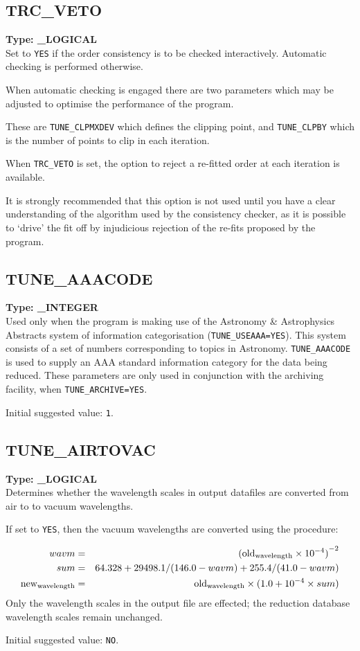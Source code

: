 \documentclass[11pt,twoside]{article}
\makeatletter
\newcommand{\htmlref}[2]{#1}
\newcommand{\xlabel}[1]{}
\newcommand{\sunspec}[2]{#1}
\renewcommand{\sunspec}[2]{#2}
\newcommand{\indexcmdname}[1]{\index{#1@\protect\cmdname{#1}}}
\renewcommand{\indexcmdname}[1]{}
\newcommand{\cmdname}{\begingroup \catcode`\_=12 \realcmdname}
\newcommand{\realcmdname}[1]{\endgroup\texttt{#1}}
\newcommand{\echparameter}[4]
{
\item [#1 = #3] \mbox{}\label{par_#2}\indexcmdname{#2}
\\
#4
}
\renewcommand{\echparameter}[4]
{
  \subsection{\xlabel{par_#2}\label{par_#2}{\bf #1}}
  {\bf Type: #3}\\
#4
}
\makeatother
\begin{document}
\echparameter{TRC\_VETO}{TRC_VETO}{
 \_LOGICAL
}{
 Set to \texttt{YES} if the order consistency is to be checked interactively.
 Automatic checking is performed otherwise.

 When automatic checking is engaged there are two parameters which
 may be adjusted to optimise the performance of the program.

 These are \htmlref{{\tt{TUNE\_CLPMXDEV}}}{par_TUNE_CLPMXDEV}
 which defines the clipping point, and
 \htmlref{{\tt{TUNE\_CLPBY}}}{par_TUNE_CLPBY}
 which is the number of points to clip in each iteration.

 When {\tt TRC\_VETO} is set, the option to reject a re-fitted order at
 each iteration is available.

 It is strongly recommended that this option is not used until you
 have a clear understanding of the algorithm used by the consistency
 checker, as it is possible to `drive' the fit off by injudicious
 rejection of the re-fits proposed by the program.
}

\echparameter{TUNE\_AAACODE}{TUNE_AAACODE}{
 \_INTEGER
}{
 Used only when the program is  making use of the Astronomy \&
 Astrophysics Abstracts system of information categorisation
 (\htmlref{{\tt{TUNE\_USEAAA=YES}}}{par_TUNE_USEAAA}).
 This system consists of a set of numbers
 corresponding to topics in Astronomy. {\tt TUNE\_AAACODE} is used to
 supply an AAA standard information category for the data being
 reduced.  These parameters are only used in conjunction with the
 archiving facility, when \htmlref{{\tt TUNE\_ARCHIVE=YES}}{par_TUNE_ARCHIVE}.

 Initial suggested value: \texttt{1}.
}

\echparameter{TUNE\_AIRTOVAC}{TUNE_AIRTOVAC}{
 \_LOGICAL
}{
 Determines whether the wavelength scales in output datafiles are
 converted from air to to vacuum wavelengths.

 If set to \texttt{YES}, then the vacuum wavelengths are converted using
 the procedure:


\begin{eqnarray*}
    wavm & = & {( {\rm old_{wavelength}} \times 10^{-4} )}^{-2} \\
    sum & = & 64.328 + 29498.1 / ( 146.0 - wavm ) + 255.4 / ( 41.0 - wavm )\\
    {\rm new_{wavelength}} & = & {\rm old_{wavelength}} \times ( 1.0 + 
10^{-4} \times sum ) 
\end{eqnarray*}
%
 Only the wavelength scales in the output file are effected;
 the reduction database wavelength scales remain unchanged.

 Initial suggested value: \texttt{NO}.
}
\end{document}
